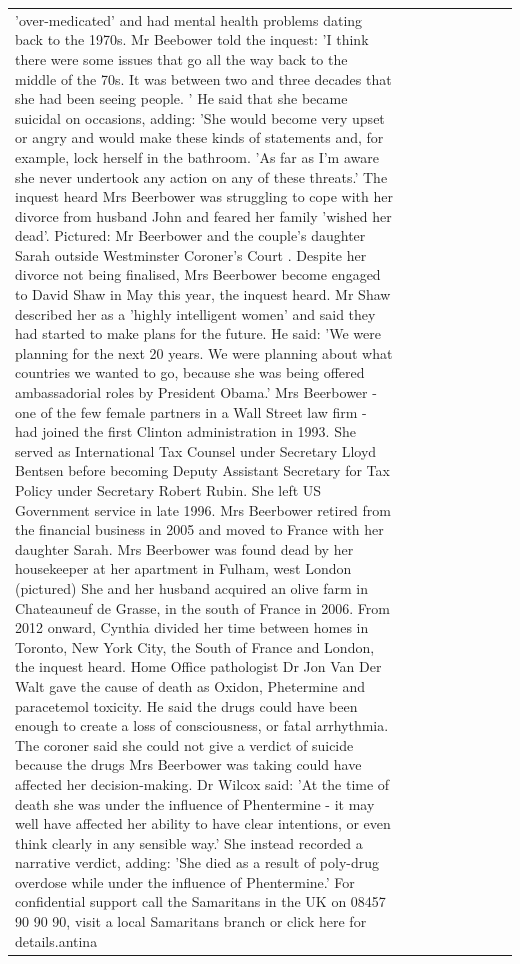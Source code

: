 \begin{table}[H]
\begin{tabular}{lllrlllll}
'over-medicated' and had mental health problems dating back to the 1970s. Mr Beebower told the inquest: 'I think there were some issues that go all the way back to the middle of the 70s. It was between two and three decades that she had been seeing people. ' He said that she became suicidal on occasions, adding: 'She would become very upset or angry and would make these kinds of statements and, for example, lock herself in the bathroom. 'As far as I'm aware she never undertook any action on any of these threats.' The inquest heard Mrs Beerbower was struggling to cope with her divorce from husband John and feared her family 'wished her dead'. Pictured: Mr Beerbower and the couple's daughter Sarah outside Westminster Coroner's Court . Despite her divorce not being finalised, Mrs Beerbower become engaged to David Shaw in May this year, the inquest heard. Mr Shaw described her as a 'highly intelligent women' and said they had started to make plans for the future. He said: 'We were planning for the next 20 years. We were planning about what countries we wanted to go, because she was being offered ambassadorial roles by President Obama.' Mrs Beerbower - one of the few female partners in a Wall Street law firm - had joined the first Clinton administration in 1993. She served as International Tax Counsel under Secretary Lloyd Bentsen before becoming Deputy Assistant Secretary for Tax Policy under Secretary Robert Rubin. She left US Government service in late 1996. Mrs Beerbower retired from the financial business in 2005 and moved to France with her daughter Sarah. Mrs Beerbower was found dead by her housekeeper at her apartment in Fulham, west London (pictured) She and her husband acquired an olive farm in Chateauneuf de Grasse, in the south of France in 2006. From 2012 onward, Cynthia divided her time between homes in Toronto, New York City, the South of France and London, the inquest heard. Home Office pathologist Dr Jon Van Der Walt gave the cause of death as Oxidon, Phetermine and paracetemol toxicity. He said the drugs could have been enough to create a loss of consciousness, or fatal arrhythmia. The coroner said she could not give a verdict of suicide because the drugs Mrs Beerbower was taking could have affected her decision-making. Dr Wilcox said: 'At the time of death she was under the influence of Phentermine - it may well have affected her ability to have clear intentions, or even think clearly in any sensible way.' She instead recorded a narrative verdict, adding: 'She died as a result of poly-drug overdose while under the influence of Phentermine.' For confidential support call the Samaritans in the UK on 08457 90 90 90, visit a local Samaritans branch or click here for details.antina \\

\end{tabular}
\end{table}
